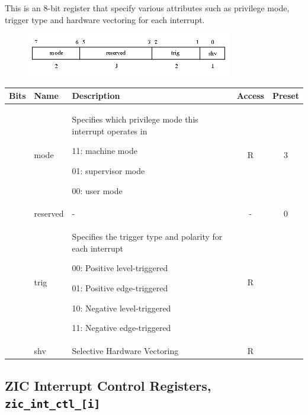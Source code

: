 This is an 8-bit register that specify various attributes such as privilege mode, trigger type and hardware vectoring for each interrupt.

\vspace{0.5cm}
\begin{figure}[H]
    \centering
    \includegraphics[width = 9cm]{images/zic_int_attr.png}
    \label{fig:zic_int_attr}
\end{figure}
\vspace{0.5cm}

\vspace{0.5cm}
\begin{table}[H]
    \label{tab:zic_int_attr}
        \centering
        \begin{tabular}{l l p{8cm} c c}
         \hline 
         \textbf{Bits} & \textbf{Name} & \textbf{Description} & \textbf{Access} & \textbf{Preset}\\ \hline \hline
         [7:6] & mode & Specifies which privilege mode this interrupt operates in
         
         11: machine mode 
         
         01: supervisor mode
         
         00: user mode & R & 3 \\ \hline
         [5:3] & reserved & - & - & 0 \\ \hline
         [2:1] & trig & Specifies the trigger type and polarity for each interrupt
         
         00: Positive level-triggered
         
         01: Positive edge-triggered
         
         10: Negative level-triggered
         
         11: Negative edge-triggered & R & \\ \hline
         [0] & shv & Selective Hardware Vectoring & R & \\ \hline
        \end{tabular}
\end{table}
\vspace{0.5cm}

\subsection{ZIC Interrupt Control Registers, \texttt{zic\_int\_ctl\_[i]}}
\label{subsec:zic-int-ctl}

